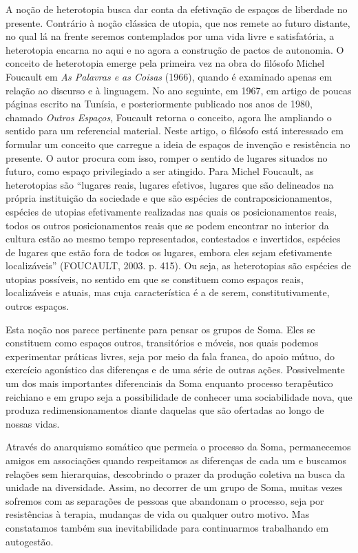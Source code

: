 A noção de heterotopia busca dar conta da efetivação de espaços de
liberdade no presente. Contrário à noção clássica de utopia, que nos
remete ao futuro distante, no qual lá na frente seremos contemplados por
uma vida livre e satisfatória, a heterotopia encarna no aqui e no agora
a construção de pactos de autonomia. O conceito de heterotopia emerge
pela primeira vez na obra do filósofo Michel Foucault em \emph{As
Palavras e as Coisas} (1966), quando é examinado apenas em relação ao
discurso e à linguagem. No ano seguinte, em 1967, em artigo de poucas
páginas escrito na Tunísia, e posteriormente publicado nos anos de 1980,
chamado \emph{Outros Espaços}, Foucault retorna o conceito, agora lhe
ampliando o sentido para um referencial material. Neste artigo, o
filósofo está interessado em formular um conceito que carregue a ideia
de espaços de invenção e resistência no presente. O autor procura com
isso, romper o sentido de lugares situados no futuro, como espaço
privilegiado a ser atingido. Para Michel Foucault, as heterotopias são
``lugares reais, lugares efetivos, lugares que são delineados na própria
instituição da sociedade e que são espécies de contraposicionamentos,
espécies de utopias efetivamente realizadas nas quais os posicionamentos
reais, todos os outros posicionamentos reais que se podem encontrar no
interior da cultura estão ao mesmo tempo representados, contestados e
invertidos, espécies de lugares que estão fora de todos os lugares,
embora eles sejam efetivamente localizáveis'' (FOUCAULT, 2003. p. 415).
Ou seja, as heterotopias são espécies de utopias possíveis, no sentido
em que se constituem como espaços reais, localizáveis e atuais, mas cuja
característica é a de serem, constitutivamente, outros espaços.

Esta noção nos parece pertinente para pensar os grupos de Soma. Eles se
constituem como espaços outros, transitórios e móveis, nos quais podemos
experimentar práticas livres, seja por meio da fala franca, do apoio
mútuo, do exercício agonístico das diferenças e de uma série de outras
ações. Possivelmente um dos mais importantes diferenciais da Soma
enquanto processo terapêutico reichiano e em grupo seja a possibilidade
de conhecer uma sociabilidade nova, que produza redimensionamentos
diante daquelas que são ofertadas ao longo de nossas vidas.

Através do anarquismo somático que permeia o processo da Soma,
permanecemos amigos em associações quando respeitamos as diferenças de
cada um e buscamos relações sem hierarquias, descobrindo o prazer da
produção coletiva na busca da unidade na diversidade. Assim, no decorrer
de um grupo de Soma, muitas vezes sofremos com as separações de pessoas
que abandonam o processo, seja por resistências à terapia, mudanças de
vida ou qualquer outro motivo. Mas constatamos também sua
inevitabilidade para continuarmos trabalhando em autogestão.

